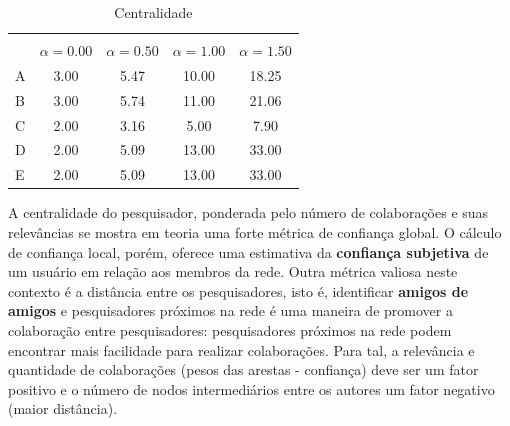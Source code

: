 \documentclass[12pt]{article}
\begin{document}
{\tiny
  \begin{table}[ht]
    \caption{Centralidade}
    \label{tab:centrality}
    \centering
    \begin{tabular}{|lcccc|}
      \hline
      \rowcolor[HTML]{343434} 
      \multicolumn{1}{|c}{\cellcolor[HTML]{343434}{\color[HTML]{FFFFFF} }}                       & \multicolumn{4}{c|}{\cellcolor[HTML]{343434}{\color[HTML]{FFFFFF} $C_D ^{w \alpha} (i)$}}                                              \\
      \rowcolor[HTML]{656565} 
      \multicolumn{1}{|c}{\multirow{-2}{*}{\cellcolor[HTML]{343434}{\color[HTML]{FFFFFF} Nodo}}} & {\color[HTML]{FFFFFF} $\alpha = 0.00$} & {\color[HTML]{FFFFFF} $\alpha = 0.50$} & {\color[HTML]{FFFFFF} $\alpha = 1.00$} & {\color[HTML]{FFFFFF} $\alpha = 1.50$} \\
      \multicolumn{1}{|l|}{A}                                                                    & 3.00                        & 5.47                        & 10.00                       & 18.25                       \\
      \multicolumn{1}{|l|}{B}                                                                    & 3.00                        & 5.74                        & 11.00                       & 21.06                       \\
      \multicolumn{1}{|l|}{C}                                                                    & 2.00                        & 3.16                        & 5.00                        & 7.90                        \\
      \multicolumn{1}{|l|}{D}                                                                    & 2.00                        & 5.09                        & 13.00                       & 33.00                       \\
      \multicolumn{1}{|l|}{E}                                                                    & 2.00                        & 5.09                        & 13.00                       & 33.00                       \\ \hline
    \end{tabular}
  \end{table}  
  }


A centralidade do pesquisador, ponderada pelo número de colaborações e suas relevâncias se mostra em teoria uma forte métrica de confiança global. O cálculo de confiança local, porém, oferece uma estimativa da \textbf{confiança subjetiva} de um usuário em relação aos membros da rede. Outra métrica valiosa neste contexto é a distância entre os pesquisadores, isto é, identificar \textbf{amigos de amigos} e pesquisadores próximos na rede é uma maneira de promover a colaboração entre pesquisadores: pesquisadores próximos na rede podem encontrar mais facilidade para realizar colaborações. Para tal, a relevância e quantidade de colaborações (pesos das arestas - confiança) deve ser um fator positivo e o número de nodos intermediários entre os autores um fator negativo (maior distância).
\end{document}

